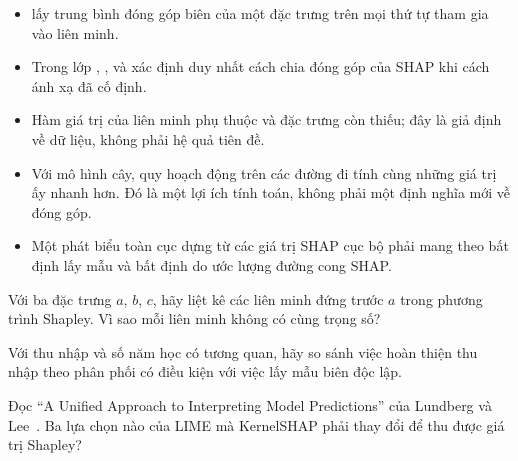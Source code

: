 \begin{tomtat}
\begin{itemize}
  \item {} lấy trung bình đóng góp biên của một đặc trưng trên
  mọi thứ tự tham gia vào liên minh.
  \item Trong lớp , ,
   và  xác định duy nhất cách chia đóng góp của SHAP khi cách ánh xạ đã cố định.
  \item Hàm giá trị của liên minh phụ thuộc  và
   đặc trưng còn thiếu; đây là giả định về dữ liệu, không phải hệ quả tiên đề.
  \item Với mô hình cây, quy hoạch động trên các đường đi tính cùng những giá
  trị ấy nhanh hơn. Đó là một lợi ích tính toán, không phải một định nghĩa mới
  về đóng góp.
  \item Một phát biểu toàn cục dựng từ các giá trị SHAP cục bộ phải mang theo
  bất định lấy mẫu và bất định do ước lượng đường cong SHAP.
\end{itemize}
\end{tomtat}

\cauhoi
\begin{cauhoids}
  \item Với ba đặc trưng $a$, $b$, $c$, hãy liệt kê các liên minh đứng trước
  $a$ trong phương trình Shapley. Vì sao mỗi liên minh không có cùng trọng số?
  \item Với thu nhập và số năm học có tương quan, hãy so sánh việc hoàn thiện
  thu nhập theo phân phối có điều kiện với việc lấy mẫu biên độc lập.
  \item Đọc \enquote{A Unified Approach to Interpreting Model Predictions} của
  Lundberg và Lee~\autocite{p10shap}. Ba lựa chọn nào của LIME mà KernelSHAP
  phải thay đổi để thu được giá trị Shapley?
\end{cauhoids}
